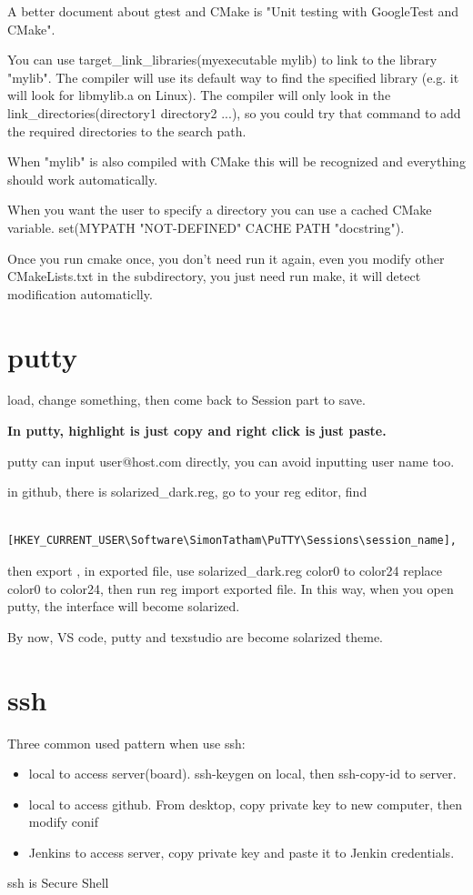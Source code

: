 \documentclass[paper=8.5in:11in, twoside, 12pt, pagesize=pdftex]{book}
\begin{document}
	A better document about gtest and CMake is "Unit testing with GoogleTest and CMake". 
		
	You can use target\_link\_libraries(myexecutable mylib) to link to the library "mylib". The compiler will use its default way to find the specified library (e.g. it will look for libmylib.a on Linux). The compiler will only look in the link\_directories(directory1 directory2 ...), so you could try that command to add the required directories to the search path.

	When "mylib" is also compiled with CMake this will be recognized and everything should work automatically.

	When you want the user to specify a directory you can use a cached CMake variable. set(MYPATH "NOT-DEFINED" CACHE PATH "docstring").

	Once you run cmake once, you don't need run it again, even you modify other CMakeLists.txt in the subdirectory, you just need run make, it will detect modification automaticlly. 


\section{putty}

  load, change something, then come back to Session part to save. 
  
  
 \textbf{In putty, highlight is just copy and right click is just paste. } 
 
  putty can input user@host.com directly, you can avoid inputting user name too. 
  
  in github, there is solarized\_dark.reg, go to your reg editor, find
  
  \begin{verbatim}
  	[HKEY_CURRENT_USER\Software\SimonTatham\PuTTY\Sessions\session_name],
  \end{verbatim}  then export , 
  in exported file, use solarized\_dark.reg color0 to color24 replace color0 to color24, then run 
  reg import exported file. In this way, when you open putty, the interface will become solarized.
 
  By now, VS code, putty and texstudio are become solarized theme. 

\section{ssh}
Three common used pattern when use ssh:
\begin{itemize}
	\item local to access server(board). ssh-keygen on local, then ssh-copy-id to server.
	
	\item local to access github. From desktop, copy private key to new computer, then modify conif
	
	\item Jenkins to access server, copy private key and paste it to Jenkin credentials. 
\end{itemize}
	ssh is Secure Shell
	
\end{document}
